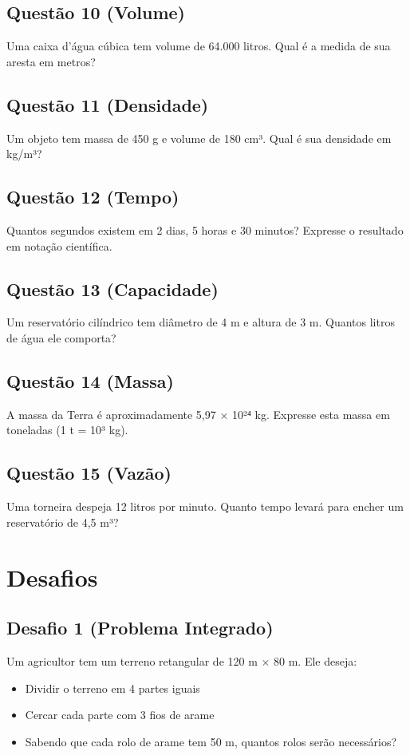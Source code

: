\documentclass[11pt]{extarticle} %
\begin{document}
\begin{multicols}{2}
\subsection*{Questão 10 (Volume)}
Uma caixa d'água cúbica tem volume de 64.000 litros. Qual é a medida de sua aresta em metros?

\subsection*{Questão 11 (Densidade)}
Um objeto tem massa de 450 g e volume de 180 cm³. Qual é sua densidade em kg/m³?

\subsection*{Questão 12 (Tempo)}
Quantos segundos existem em 2 dias, 5 horas e 30 minutos? Expresse o resultado em notação científica.

\subsection*{Questão 13 (Capacidade)}
Um reservatório cilíndrico tem diâmetro de 4 m e altura de 3 m. Quantos litros de água ele comporta?

\subsection*{Questão 14 (Massa)}
A massa da Terra é aproximadamente 5,97 × 10²⁴ kg. Expresse esta massa em toneladas (1 t = 10³ kg).

\subsection*{Questão 15 (Vazão)}
Uma torneira despeja 12 litros por minuto. Quanto tempo levará para encher um reservatório de 4,5 m³?

\section*{Desafios}

\subsection*{Desafio 1 (Problema Integrado)}
Um agricultor tem um terreno retangular de 120 m × 80 m. Ele deseja:
\begin{itemize}
\item Dividir o terreno em 4 partes iguais
\item Cercar cada parte com 3 fios de arame
\item Sabendo que cada rolo de arame tem 50 m, quantos rolos serão necessários?
\end{itemize}


\end{multicols}
\end{document}
